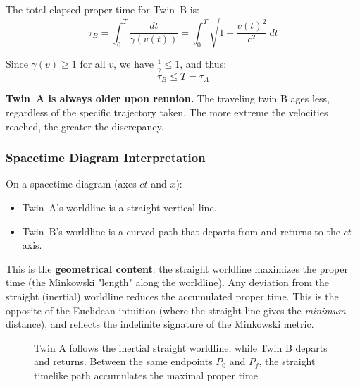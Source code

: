 The total elapsed proper time for Twin~B is:
\begin{equation}\label{eq:lec05:twin-proper-time}
    \tau_B = \int_0^T \frac{dt}{\gamma(v(t))} = \int_0^T \sqrt{1 - \frac{v(t)^2}{c^2}} \, dt
\end{equation}

Since $\gamma(v) \geq 1$ for all $v$, we have $\frac{1}{\gamma} \leq 1$, and thus:
\begin{equation}\label{eq:lec05:twin-inequality}
    \boxed{\tau_B \leq T = \tau_A}
\end{equation}

\textbf{Twin~A is always older upon reunion.} The traveling twin B ages less, regardless of the specific trajectory taken. The more extreme the velocities reached, the greater the discrepancy.

\subsubsection*{Spacetime Diagram Interpretation}

On a spacetime diagram (axes $ct$ and $x$):
\begin{itemize}
    \item Twin~A's worldline is a straight vertical line.
    \item Twin~B's worldline is a curved path that departs from and returns to the $ct$-axis.
\end{itemize}
This is the \textbf{geometrical content}: the straight worldline maximizes the proper time (the Minkowski "length" along the worldline). Any deviation from the straight (inertial) worldline reduces the accumulated proper time. This is the opposite of the Euclidean intuition (where the straight line gives the \emph{minimum} distance), and reflects the indefinite signature of the Minkowski metric.

\begin{figure}[h]
    \centering
    \caption{Twin A follows the inertial straight worldline, while Twin B
    departs and returns. Between the same endpoints $P_0$ and $P_f$, the
    straight timelike path accumulates the maximal proper time.}
    \label{fig:lec05:twin-paradox}
\end{figure}

